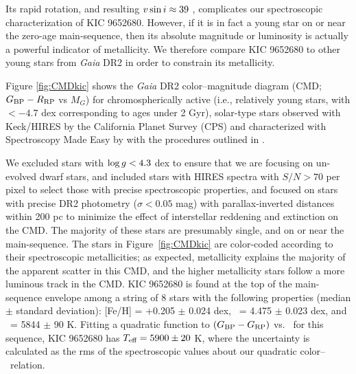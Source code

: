 Its rapid rotation, and resulting $v \sin i \approx 39$ \kms,
complicates our spectroscopic characterization of KIC 9652680.
However, if it is in fact a young star 
on or near the zero-age main-sequence, 
then its absolute magnitude or luminosity is 
actually a powerful indicator of metallicity.
We therefore compare KIC 9652680 to other young stars from \textit{Gaia} DR2 in order to constrain its metallicity. 

Figure \ref{fig:CMDkic} shows 
the \textit{Gaia} DR2 color--magnitude diagram (CMD; $G_{\rm BP} - R_{\rm RP}$ vs $M_G$)
for chromospherically active (i.e., relatively young stars, 
with \logrprime $< -4.7$ dex corresponding to ages under 2 Gyr),
solar-type stars observed with Keck/HIRES 
by the California Planet Survey (CPS) and characterized with 
Spectroscopy Made Easy \citep[SME;][]{sme, Valenti2005, Piskunov2017}
by \citet{Brewer2016} with the procedures outlined in \citet{Brewer2015}.

We excluded stars with $\log g < 4.3$ dex to ensure 
that we are focusing on un-evolved dwarf stars, 
and included stars with HIRES spectra with $S/N > 70$ per pixel
to select those with precise spectroscopic properties,
and focused on stars with precise DR2 photometry 
($\sigma < 0.05$ mag)
with parallax-inverted distances within 200 pc 
to minimize the effect of interstellar reddening and extinction 
on the CMD.
The majority of these stars are presumably single, 
and on or near the main-sequence. 
The stars in Figure~\ref{fig:CMDkic} are color-coded according to their spectroscopic metallicities; as expected, metallicity explains the majority of the 
apparent scatter in this CMD, 
and the higher metallicity stars follow a 
more luminous track in the CMD. 
KIC 9652680 is found at the top of
the main-sequence envelope 
among a string of 8 stars with the following properties 
(median $\pm$ standard deviation): 
[Fe/H] = +0.205 $\pm$ 0.024 dex, 
\logg\ =  4.475 $\pm$ 0.023 dex, 
and 
\teff\ =  5844 $\pm$ 90 K. 
Fitting a quadratic function to 
$(G_{\rm BP} - G_{\rm RP})$ vs. \teff\ for this sequence, 
KIC 9652680 has $T_{\mbox{\scriptsize eff}} = 5900 \pm 20$ K,
where the uncertainty is calculated as the 
rms of the spectroscopic values about our 
quadratic color--\teff\ relation.

